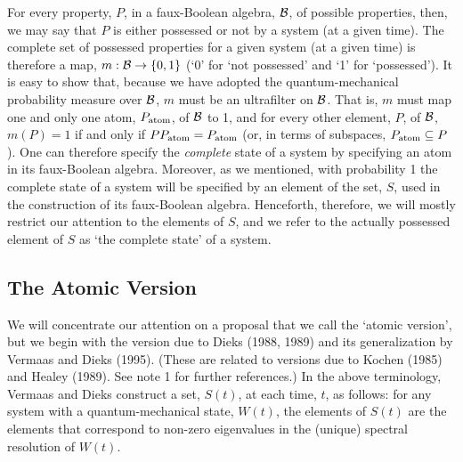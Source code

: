 \documentclass[12pt]{article}
\newcommand{\cB}{\cal{B}}                                       %
\begin{document}
For every property, $P$, in a faux-Boolean algebra, $\cB$, of possible 
properties, then, we may say that $P$ is either possessed or not by a 
system (at a given time).  The complete set of possessed properties 
for a given system (at a given time) is therefore a map, $m:{\cB} 
\rightarrow\{0,1\}$ (`0' for `not possessed' and `1' for `possessed').  
It is easy to show that, because we have adopted the 
quantum-mechanical probability measure over $\cB$, $m$ must be an 
ultrafilter on $\cB$.  That is, $m$ must map one and only one atom, 
$P_{\mbox{{\scriptsize atom}}}$, of $\cB$ to 1, and for every other 
element, $P$, of $\cB$, $m(P) = 1$ if and only if $P 
P_{\mbox{{\scriptsize atom}}} = P_{\mbox{{\scriptsize atom}}}$ (or, in 
terms of subspaces, $P_{\mbox{{\scriptsize atom}}} \subseteq P$).  One 
can therefore specify the {\it complete} state of a system by 
specifying an atom in its faux-Boolean algebra.  Moreover, as we 
mentioned, with probability 1 the complete state of a system will be 
specified by an element of the set, $S$, used in the construction of 
its faux-Boolean algebra.  Henceforth, therefore, we will mostly 
restrict our attention to the elements of $S$, and we refer to the 
actually possessed element of $S$ as `the complete state' of a system.


\subsection{The Atomic Version}


We will concentrate our attention on a proposal that we
call the `atomic version', but we begin with the version due to Dieks
(1988, 1989) and its generalization by Vermaas and Dieks (1995).
(These are related to versions due to Kochen (1985) and Healey (1989).
See note 1 for further references.) In the above terminology, Vermaas and
Dieks construct a set, $S(t)$, at each
time, $t$, as follows: for any system with a quantum-mechanical state,
$W(t)$, the elements of $S(t)$ are the elements that correspond to non-zero
eigenvalues in the (unique) spectral resolution of $W(t)$.
\end{document}
